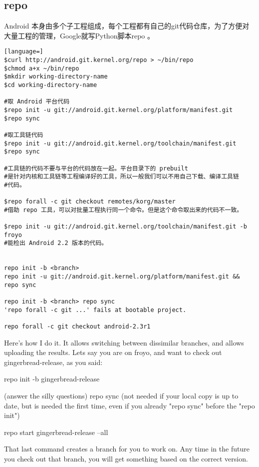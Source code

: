 \documentclass[a4paper,titlepage]{article}
\begin{document}
\subsection{repo}
Android 本身由多个子工程组成，每个工程都有自己的git代码仓库，为了方便对大量工程的管理，Google就写Python脚本repo 。
\begin{lstlisting}[language=]
$curl http://android.git.kernel.org/repo > ~/bin/repo
$chmod a+x ~/bin/repo
$mkdir working-directory-name
$cd working-directory-name

#取 Android 平台代码 
$repo init -u git://android.git.kernel.org/platform/manifest.git
$repo sync 

#取工具链代码 
$repo init -u git://android.git.kernel.org/toolchain/manifest.git 
$repo sync 

#工具链的代码不要与平台的代码放在一起。平台目录下的 prebuilt
#是针对内核和工具链等工程编译好的工具，所以一般我们可以不用自己下载、编译工具链
#代码。 

$repo forall -c git checkout remotes/korg/master
#借助 repo 工具，可以对批量工程执行同一个命令。但是这个命令取出来的代码不一致。

$repo init -u git://android.git.kernel.org/toolchain/manifest.git -b froyo
#能检出 Android 2.2 版本的代码。


repo init -b <branch>    
repo init -u git://android.git.kernel.org/platform/manifest.git && repo sync

repo init -b <branch> repo sync   
'repo forall -c git ...' fails at bootable project. 

repo forall -c git checkout android-2.3r1
\end{lstlisting}

\begin{quotation} \end{quotation}
Here's how I do it. It allows switching between dissimilar branches, and allows uploading the results.  
Lets say you are on froyo, and want to check out gingerbread-release, as you said: 

repo init -b gingerbread-release 

(answer the silly questions) 
repo sync (not needed if your local copy is up to date, but is needed the
first time, even if you already "repo sync" before the "repo init") 

repo start gingerbread-release --all 

That last command creates a branch for you to work on. Any time in the future
you check out that branch, you will get something based on the correct
version. 
\end{document}
